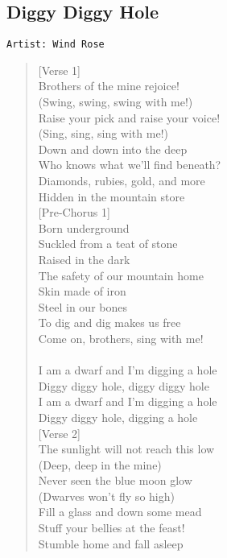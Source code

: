 \documentclass[11pt]{article}
\begin{document}
\subsection{Diggy Diggy Hole}
\label{sec:org6f25019}
\begin{verbatim}
Artist: Wind Rose
\end{verbatim}
\begin{verse}
[Verse 1]\\
Brothers of the mine rejoice!\\
(Swing, swing, swing with me!)\\
Raise your pick and raise your voice!\\
(Sing, sing, sing with me!)\\
Down and down into the deep\\
Who knows what we'll find beneath?\\
Diamonds, rubies, gold, and more\\
Hidden in the mountain store\\
\vspace*{1em}
[Pre-Chorus 1]\\
Born underground\\
Suckled from a teat of stone\\
Raised in the dark\\
The safety of our mountain home\\
Skin made of iron\\
Steel in our bones\\
To dig and dig makes us free\\
Come on, brothers, sing with me!\\
[Chorus]\\
I am a dwarf and I'm digging a hole\\
Diggy diggy hole, diggy diggy hole\\
I am a dwarf and I'm digging a hole\\
Diggy diggy hole, digging a hole\\
\vspace*{1em}
[Verse 2]\\
The sunlight will not reach this low\\
(Deep, deep in the mine)\\
Never seen the blue moon glow\\
(Dwarves won't fly so high)\\
Fill a glass and down some mead\\
Stuff your bellies at the feast!\\
Stumble home and fall asleep\\

\end{verse}
\end{document}
